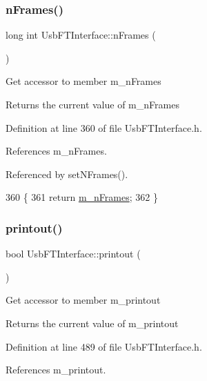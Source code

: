 \subsubsection{\texorpdfstring{n\+Frames()}{nFrames()}}
{\footnotesize\ttfamily long int Usb\+F\+T\+Interface\+::n\+Frames (\begin{DoxyParamCaption}{ }\end{DoxyParamCaption})\hspace{0.3cm}{\ttfamily [inline]}}

Get accessor to member m\+\_\+n\+Frames \begin{DoxyReturn}{Returns}
the current value of m\+\_\+n\+Frames 
\end{DoxyReturn}


Definition at line 360 of file Usb\+F\+T\+Interface.\+h.



References m\+\_\+n\+Frames.



Referenced by set\+N\+Frames().


\begin{DoxyCode}
360                       \{
361     \textcolor{keywordflow}{return} \hyperlink{classUsbFTInterface_a40770504afc4173034c8a8d6c5f5962c}{m\_nFrames};
362   \}
\end{DoxyCode}
\mbox{\label{classUsbFTInterface_ad312ac511dfb57c513f2998de396ba9b}} 
\subsubsection{\texorpdfstring{printout()}{printout()}}
{\footnotesize\ttfamily bool Usb\+F\+T\+Interface\+::printout (\begin{DoxyParamCaption}{ }\end{DoxyParamCaption})\hspace{0.3cm}{\ttfamily [inline]}}

Get accessor to member m\+\_\+printout \begin{DoxyReturn}{Returns}
the current value of m\+\_\+printout 
\end{DoxyReturn}


Definition at line 489 of file Usb\+F\+T\+Interface.\+h.



References m\+\_\+printout.



